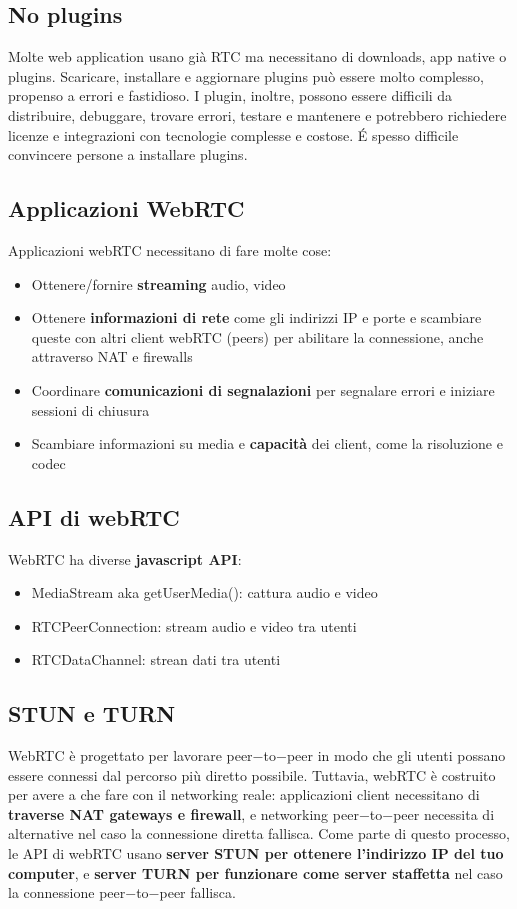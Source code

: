 \subsection{No plugins}
Molte web application usano già RTC ma necessitano di downloads, app native o plugins. Scaricare, installare e aggiornare plugins può essere molto complesso, propenso a errori e fastidioso. I plugin, inoltre, possono essere difficili da distribuire, debuggare, trovare errori, testare e mantenere e potrebbero richiedere licenze e integrazioni con tecnologie complesse e costose. \'E spesso difficile convincere persone a installare plugins.

\subsection{Applicazioni WebRTC}
Applicazioni webRTC necessitano di fare molte cose:
\begin{itemize}
    \item Ottenere/fornire \textbf{streaming} audio, video
    \item Ottenere \textbf{informazioni di rete} come gli indirizzi IP e porte e scambiare queste con altri client webRTC (peers) per abilitare la connessione, anche attraverso NAT e firewalls
    \item Coordinare \textbf{comunicazioni di segnalazioni} per segnalare errori e iniziare sessioni di chiusura
    \item Scambiare informazioni su media e \textbf{capacità} dei client, come la risoluzione e codec
\end{itemize}

\subsection{API di webRTC}
WebRTC ha diverse \textbf{javascript API}:
\begin{itemize}
    \item MediaStream aka getUserMedia(): cattura audio e video
    \item RTCPeerConnection: stream audio e video tra utenti
    \item RTCDataChannel: strean dati tra utenti
\end{itemize}

\subsection{STUN e TURN}
WebRTC è progettato per lavorare peer$-$to$-$peer in modo che gli utenti possano essere connessi dal percorso più diretto possibile. Tuttavia, webRTC è costruito per avere a che fare con il networking reale: applicazioni client necessitano di \textbf{traverse NAT gateways e firewall}, e networking peer$-$to$-$peer necessita di alternative nel caso la connessione diretta fallisca. Come parte di questo processo, le API di webRTC usano \textbf{server STUN per ottenere l'indirizzo IP del tuo computer}, e \textbf{server TURN per funzionare come server staffetta} nel caso la connessione peer$-$to$-$peer fallisca.


